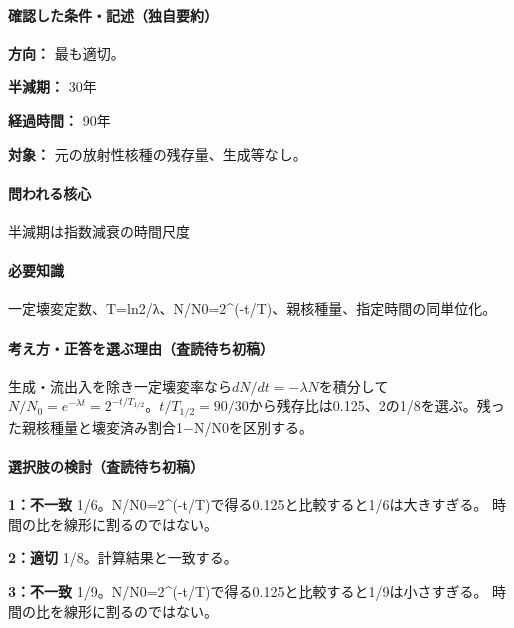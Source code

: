 \paragraph{確認した条件・記述（独自要約）}\mbox{}\par

\noindent\textbf{方向：} 最も適切。\par

\noindent\textbf{半減期：} 30年\par

\noindent\textbf{経過時間：} 90年\par

\noindent\textbf{対象：} 元の放射性核種の残存量、生成等なし。\par

\paragraph{問われる核心} 半減期は指数減衰の時間尺度

\paragraph{必要知識} 一定壊変定数、T=\allowbreak{}ln2/λ、N/N0=\allowbreak{}2\textasciicircum{}(-t/T)、親核種量、指定時間の同単位化。

\paragraph{考え方・正答を選ぶ理由（査読待ち初稿）} 生成・流出入を除き一定壊変率なら\(dN/dt=-\lambda N\)を積分して\(N/N_0=e^{-\lambda t}=2^{-t/T_{1/2}}\)。\(t/T_{1/2}=90/30\)から残存比は0.125、2の1/8を選ぶ。残った親核種量と壊変済み割合1−N/N0を区別する。

\paragraph{選択肢の検討（査読待ち初稿）}\mbox{}\par

\noindent\textbf{1：不一致} 1/6。N/N0=\allowbreak{}2\textasciicircum{}(-t/T)で得る0.125と比較すると1/6は大きすぎる。 時間の比を線形に割るのではない。\par

\noindent\textbf{2：適切} 1/8。計算結果と一致する。\par

\noindent\textbf{3：不一致} 1/9。N/N0=\allowbreak{}2\textasciicircum{}(-t/T)で得る0.125と比較すると1/9は小さすぎる。 時間の比を線形に割るのではない。\par

